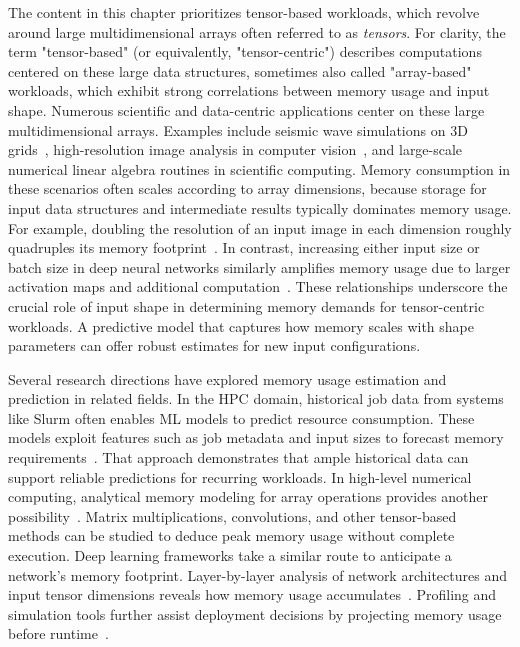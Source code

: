 The content in this chapter prioritizes tensor-based workloads, which revolve around large multidimensional arrays often referred to as \textit{tensors}.
For clarity, the term "tensor-based" (or equivalently, "tensor-centric") describes computations centered on these large data structures, sometimes also called "array-based" workloads, which exhibit strong correlations between memory usage and input shape.
Numerous scientific and data-centric applications center on these large multidimensional arrays.
Examples include seismic wave simulations on \ac{3D} grids~\cite{okamoto2010}, high-resolution image analysis in computer vision~\cite{yuyang2024}, and large-scale numerical linear algebra routines in scientific computing.
Memory consumption in these scenarios often scales according to array dimensions, because storage for input data structures and intermediate results typically dominates memory usage.
For example, doubling the resolution of an input image in each dimension roughly quadruples its memory footprint~\cite{stackoverflow_memory_inv}. In contrast, increasing either input size or batch size in deep neural networks similarly amplifies memory usage due to larger activation maps and additional computation~\cite{dell_3dunet_memory}.
These relationships underscore the crucial role of input shape in determining memory demands for tensor-centric workloads.
A predictive model that captures how memory scales with shape parameters can offer robust estimates for new input configurations.

Several research directions have explored memory usage estimation and prediction in related fields.
In the \ac{HPC} domain, historical job data from systems like Slurm often enables \ac{ML} models to predict resource consumption.
These models exploit features such as job metadata and input sizes to forecast memory requirements~\cite{yoo2003slurm}.
That approach demonstrates that ample historical data can support reliable predictions for recurring workloads.
In high-level numerical computing, analytical memory modeling for array operations provides another possibility~\cite{cornell_memory_workshop}.
Matrix multiplications, convolutions, and other tensor-based methods can be studied to deduce peak memory usage without complete execution.
Deep learning frameworks take a similar route to anticipate a network's memory footprint.
Layer-by-layer analysis of network architectures and input tensor dimensions reveals how memory usage accumulates~\cite{gao2020, dell_3dunet_memory}.
Profiling and simulation tools further assist deployment decisions by projecting memory usage before runtime~\cite{tanash2019}.

